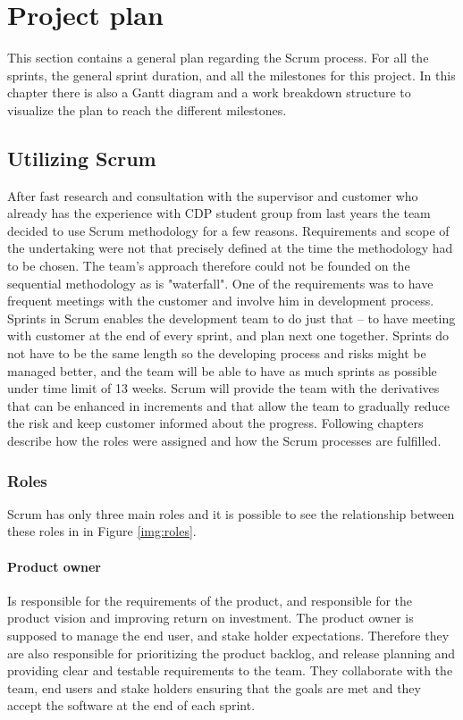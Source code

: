 \section{Project plan}
This section contains a general plan regarding the Scrum process. For all the sprints, the general sprint duration, and all the milestones for this project. In this chapter there is also a Gantt diagram and a work breakdown structure to visualize the plan to reach the different milestones.

\subsection{Utilizing Scrum} \label{txt:utilizing_scrum}

After fast research and consultation with the supervisor and customer who already has the experience with CDP student group from last years the team decided to use Scrum methodology for a few reasons. Requirements and scope of the undertaking were not that precisely defined at the time the methodology had to be chosen. The team's approach therefore could not be founded on the sequential methodology as is "waterfall". One of the requirements was to have frequent meetings with the customer and involve him in development process. Sprints in Scrum enables the development team to do just that --
to have meeting with customer at the end of every sprint, and plan next one together. Sprints do not have to be the same length so the developing process and risks might be managed better, and the team will be able to have as much sprints as possible under time limit of 13 weeks. Scrum will provide the team with the derivatives that can be enhanced in increments and that allow the team to gradually reduce the risk and keep customer informed about the progress. Following chapters describe how the roles were assigned and how the Scrum processes are fulfilled.

\subsubsection{Roles}
Scrum has only three main roles and it is possible to see the relationship between these roles in in Figure \ref{img:roles}. 

\paragraph{Product owner}
Is responsible for the requirements of the product, and responsible for the product vision and improving return on investment. The product owner is supposed to manage the end user, and stake holder expectations. Therefore they are also responsible for prioritizing the product backlog, and release planning and providing clear and testable requirements to the team.  They collaborate with the team, end users and stake holders ensuring that the goals are met and they accept the software at the end of each sprint.  

